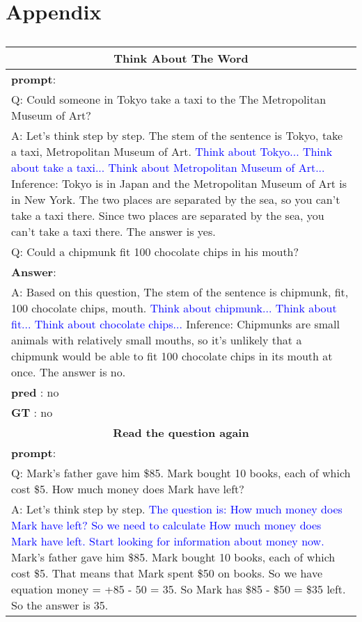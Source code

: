 \section{Appendix}
\label{sec:appendix}
%
\begin{table}[!h]
\small
\caption{}
  \label{wide_table1}
  \begin{tabularx}{\textwidth}{X}
    \toprule
    \multicolumn{1}{c}{\textbf{Think About The Word}} \\\midrule
\textbf{prompt}: \\
Q: Could someone in Tokyo take a taxi to the The Metropolitan Museum of Art?\\
A: Let's think step by step. The stem of the sentence is Tokyo, take a taxi, Metropolitan Museum of Art. \textcolor{blue}{Think about Tokyo... Think about take a taxi... Think about Metropolitan Museum of Art...} Inference: Tokyo is in Japan and the Metropolitan Museum of Art is in New York. The two places are separated by the sea, so you can't take a taxi there. Since two places are separated by the sea, you can't take a taxi there. The answer is yes.  \\

Q: Could a chipmunk fit 100 chocolate chips in his mouth?\\\midrule
\textbf{Answer}:\\
A:
Based on this question, The stem of the sentence is chipmunk, fit, 100 chocolate chips, mouth. \textcolor{blue} {Think about chipmunk... Think about fit... Think about chocolate chips...} Inference: Chipmunks are small animals with relatively small mouths, so it's unlikely that a chipmunk would be able to fit 100 chocolate chips in its mouth at once. The answer is no.\\
\textbf{pred} : no\\
\textbf{GT} : no\\\toprule
    \multicolumn{1}{c}{\textbf{Read the question again}} \\\midrule
\textbf{prompt}: \\
Q: Mark's father gave him \$85. Mark bought 10 books, each of which cost \$5. How much money does Mark have left?\\
A: Let's think step by step. \textcolor{blue} {The question is: How much money does Mark have left? So we need to calculate How much money does Mark have left. Start looking for information about money now.} Mark's father gave him \$85. Mark bought 10 books, each of which cost \$5. That means that Mark spent \$50 on books. So we have equation money = +85 - 50 = 35. So Mark has \$85 - \$50 = \$35 left. So the answer is 35.\\


\end{tabularx}
\end{table}
